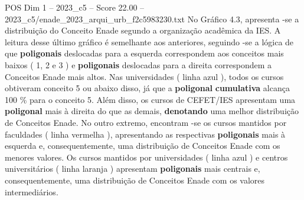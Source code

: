 \begin{textsample}{POS Dim 1 – 2023\_c5 – Score 22.00 – 2023\_c5/enade\_2023\_arqui\_urb\_f2c5983230.txt}
No Gráfico 4.3, apresenta -se a distribuição do Conceito Enade segundo a organização acadêmica da IES.
A leitura desse último gráfico é semelhante aos anteriores, seguindo -se a lógica de que \textbf{poligonais} deslocadas para a esquerda correspondem aos conceitos mais baixos ( 1, 2 e 3 ) e \textbf{poligonais} deslocadas para a direita correspondem a Conceitos Enade mais altos.
Nas universidades ( linha azul ), todos os cursos obtiveram conceito 5 ou abaixo disso, já que a \textbf{poligonal} \textbf{cumulativa} alcança 100 \% para o conceito 5.
Além disso, os cursos de CEFET/IES apresentam uma \textbf{poligonal} mais à direita do que as demais, \textbf{denotando} uma melhor distribuição de Conceitos Enade.
No outro extremo, encontram -se os cursos mantidos por faculdades ( linha vermelha ), apresentando as respectivas \textbf{poligonais} mais à esquerda e, consequentemente, uma distribuição de Conceitos Enade com os menores valores.
Os cursos mantidos por universidades ( linha azul ) e centros universitários ( linha laranja ) apresentam \textbf{poligonais} mais centrais e, consequentemente, uma distribuição de Conceitos Enade com os valores intermediários.

\end{textsample}
